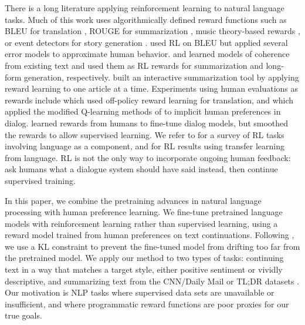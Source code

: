 \documentclass{article}
\begin{document}
There is a long literature applying reinforcement learning to natural language tasks.  Much of this work uses algorithmically defined reward functions such as BLEU for translation \citep{ranzato2015sequence,wu2016google}, ROUGE for summarization \citep{ranzato2015sequence,paulus2017deep,wu2018learning,gao2019reward}, music theory-based rewards \citep{jaques2017sequence}, or event detectors for story generation \citep{tambwekar2018controllable}.  \citet{nguyen2017reinforcement} used RL on BLEU but applied several error models to approximate human behavior.  \citet{wu2018learning} and \citet{cho2019towards} learned models of coherence from existing text and used them as RL rewards for summarization and long-form generation, respectively.  \citet{gao2019preference} built an interactive summarization tool by applying reward learning to one article at a time.  
Experiments using human evaluations as rewards include \citet{kreutzer2018reliability} which used off-policy reward learning for translation, and \citet{jaques2019way} which applied the modified Q-learning methods of \citet{jaques2017sequence} to implicit human preferences in dialog.  \citet{yi2019towards} learned rewards from humans to fine-tune dialog models, but smoothed the rewards to allow supervised learning.  We refer to \citet{luketina2019survey} for a survey of RL tasks involving language as a component, and for RL results using transfer learning from language.  RL is not the only way to incorporate ongoing human feedback: \citet{hancock2019learning} ask humans what a dialogue system should have said instead, then continue supervised training.

In this paper, we combine the pretraining advances in natural language processing with human preference learning.  We fine-tune pretrained language models with reinforcement learning rather than supervised learning, using a reward model trained from human preferences on text continuations.  Following \citet{jaques2017sequence,jaques2019way}, we use a KL constraint to prevent the fine-tuned model from drifting too far from the pretrained model.  We apply our method to two types of tasks: continuing text in a way that matches a target style, either positive sentiment or vividly descriptive, and summarizing text from the CNN/Daily Mail or TL;DR datasets \citep{hermann2015teaching,volske2017tldr}.  Our motivation is NLP tasks where supervised data sets are unavailable or insufficient, and where programmatic reward functions are poor proxies for our true goals.  
\end{document}

